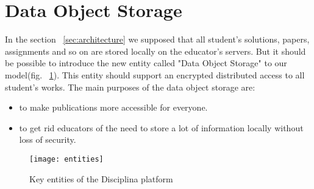 \appendix
\section{Data Object Storage}

In the section ~\ref{sec:architecture} we supposed that all student's solutions, papers, assignments and so on are stored locally on the educator's servers. But it should be possible to introduce the new entity called "Data Object Storage" to our model(fig. ~\ref{fig:entities-object-storage}). This entity should support an encrypted distributed access to all student's works. The main purposes of the data object storage are:
\begin{itemize}
\item to make publications more accessible for everyone.
\item to get rid educators of the need to store a lot of information locally without loss of security.
\end{itemize}

\begin{figure}[ht]
\centering
\texttt{[image: entities]}
\caption{Key entities of the Disciplina platform}
\label{fig:entities-object-storage}
\end{figure}
